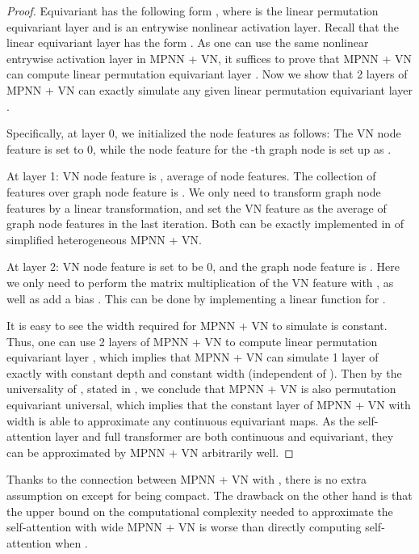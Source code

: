 \documentclass[nohyperref]{article}
\theoremstyle{plain}
\theoremstyle{definition}
\theoremstyle{remark}
\newcommand{\DS}{\text{DeepSets}}
\begin{document}
\begin{proof}
Equivariant \DS{} has the following form , where  is the linear permutation equivariant layer and  is an entrywise nonlinear activation layer.
Recall that the linear equivariant layer has the form . 
As one can use the same nonlinear entrywise activation layer  in MPNN + VN, it suffices to prove that MPNN + VN can compute linear permutation equivariant layer . Now we show that 2 layers of MPNN + VN can exactly simulate any given linear permutation equivariant layer . 


Specifically, at layer 0, we initialized the node features as follows: The VN node feature is set to 0, while the node feature for the -th graph node is set up as .  

At layer 1: VN node feature is , average of node features. The collection of features over  graph node feature is . 
We only need to transform graph node features by a linear transformation, and set the VN feature as the average of graph node features in the last iteration. Both can be exactly implemented in  of simplified heterogeneous MPNN + VN. 

At layer 2: VN node feature is set to be 0, and the graph node feature is . Here we only need to perform the matrix multiplication of the VN feature with , as well as add a bias . This can be done by implementing a linear function for . 

It is easy to see the width required for MPNN + VN to simulate \DS{} is constant.
Thus, one can use 2 layers of MPNN + VN to compute linear permutation equivariant layer , which implies that MPNN + VN can simulate 1 layer of \DS{} exactly with constant depth and constant width (independent of ). Then by the universality of \DS{}, stated in , we conclude that MPNN + VN is also permutation equivariant universal, which implies that the constant layer of MPNN + VN with  width is able to approximate any continuous equivariant maps. As the self-attention layer  and full transformer are both continuous and equivariant, they can be approximated by MPNN + VN arbitrarily well.      
\end{proof}
Thanks to the connection between MPNN + VN with \DS{}, there is no extra assumption on  except for being compact. The drawback on the other hand is that the upper bound on the computational complexity needed to approximate the self-attention with wide MPNN + VN is worse than directly computing self-attention when . 
\end{document}

